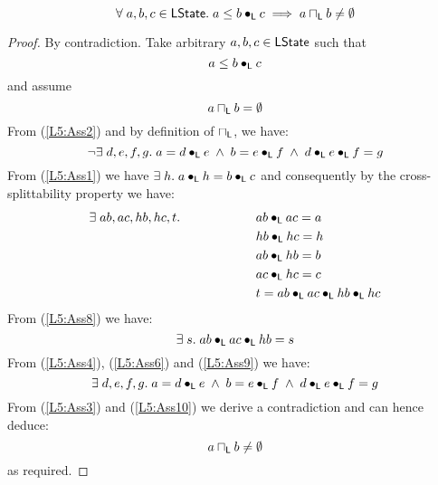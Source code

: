 \begin{lemma}[]\label{lem:nonEmptyOverlap}
%
\[
	\forall\; a, b, c \in \textsf{LState}.\; a \leq b \bullet_{\textsf{L}} c \implies a \sqcap_{\textsf{L}} b \not= \emptyset
\]
%
\begin{proof} By contradiction.
Take arbitrary $a, b, c \in \textsf{LState}$ such that 
%
\begin{equation}
	a \leq b \bullet_{\textsf{L}} c \label{L5:Ass1}
\end{equation}
%
and assume
%
\begin{equation}
	a \sqcap_{\textsf{L}} b = \emptyset \label{L5:Ass2}
\end{equation}
%
From (\ref{L5:Ass2}) and by definition of $\sqcap_{\textsf{L}}$, we have:
%
\begin{equation}
	\neg\exists\; d, e, f, g.\; a = d \bullet_{\textsf{L}} e \;\land\; b = e \bullet_{\textsf{L}} f \;\land\; d \bullet_{\textsf{L}} e \bullet_{\textsf{L}} f = g \label{L5:Ass3}
\end{equation}
%
From (\ref{L5:Ass1}) we have $\exists\; h.\; a \bullet_{\textsf{L}} h = b \bullet_{\textsf{L}} c$ and consequently by the cross-splittability property we have:
%
\begin{align}
	\exists\; ab, ac, hb, hc, t.\; \hspace*{2cm}&
	ab \bullet_{\textsf{L}} ac = a 	\label{L5:Ass4}\\
	& hb \bullet_{\textsf{L}} hc = h \label{L5:Ass5}\\
	& ab \bullet_{\textsf{L}} hb = b \label{L5:Ass6}\\
	& ac \bullet_{\textsf{L}} hc = c \label{L5:Ass7}\\
	& t = ab \bullet_{\textsf{L}} ac \bullet_{\textsf{L}} hb \bullet_{\textsf{L}} hc \label{L5:Ass8}
\end{align}
%
From (\ref{L5:Ass8}) we have:
%
\begin{equation}
	\exists\; s.\; ab \bullet_{\textsf{L}} ac \bullet_{\textsf{L}} hb = s \label{L5:Ass9}
\end{equation}
%
From (\ref{L5:Ass4}), (\ref{L5:Ass6}) and (\ref{L5:Ass9}) we have: 
%
\begin{equation}
	\exists\; d, e, f, g.\; a = d \bullet_{\textsf{L}} e \;\land\; b = e \bullet_{\textsf{L}} f \;\land\; d \bullet_{\textsf{L}} e \bullet_{\textsf{L}} f = g \label{L5:Ass10}
\end{equation}
%
From (\ref{L5:Ass3}) and (\ref{L5:Ass10}) we derive a contradiction and can hence deduce:
%
\begin{equation}
	a \sqcap_{\textsf{L}} b \not= \emptyset \nonumber
\end{equation}
%
as required.
\end{proof}
\end{lemma}
%
%
